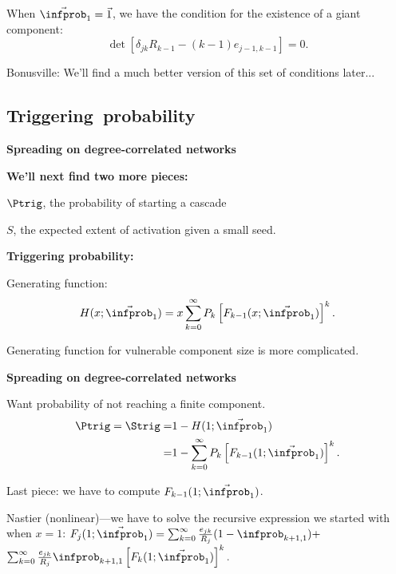     When $\vec{\infprob}_1=\vec{1}$, we have the condition
    for the existence of a giant component:
    $$
    \det
    \left[
      \delta_{jk} R_{k-1} 
      -
      (k-1) e_{j-1,k-1}
    \right] = 0.
    $$
  
    Bonusville: We'll find a much better
    version of this set of conditions later...
  



\subsection{Triggering\ probability}

  \textbf{Spreading on degree-correlated networks}

  \textbf{We'll next find two more pieces:}
    
     
      $\Ptrig$, the probability of starting a cascade
    
      $S$, the expected extent of activation given
      a small seed.
    

    \textbf{Triggering probability:}
      
       
        Generating function:
        $$
        H(x;\vec{\infprob}_1)
        = 
        x
        \sum_{k=0}^\infty
        P_k
        \left[
          F_{k-1}(x;\vec{\infprob}_1)
        \right]^k.
        $$
      
        Generating function for vulnerable
        component size is more complicated.
      
    
    
  


  \textbf{Spreading on degree-correlated networks}


  
   
    Want probability of \alert{not reaching} a finite component.
    \begin{align}
      \nonumber
      \Ptrig  = \Strig 
      = & 
      1 -
      H(1;\vec{\infprob}_1) 
      \\
      \nonumber
      = &
      1
      -
      \sum_{k=0}^\infty
      P_k
      \left[
        F_{k-1}(1;\vec{\infprob}_1)
      \right]^k.
    \end{align}
  
    Last piece: we have to compute $F_{k-1}(1;\vec{\infprob}_1)$.
  
    Nastier (nonlinear)---we have to solve the 
    recursive expression we started with when $x=1$:
    $
      F_j(1;\vec{\infprob}_1)
      =
      \sum_{k=0}^{\infty} 
      \frac{e_{jk}}{R_j}
      ( 1 - \infprob_{k+1,1} )
      + $\\
      \mbox{} \hfill
      $
      \sum_{k=0}^{\infty} 
      \frac{e_{jk}}{R_j}
      \infprob_{k+1,1}
      \left[
        F_k(1;\vec{\infprob}_1)
      \right]^k.
    $
  
